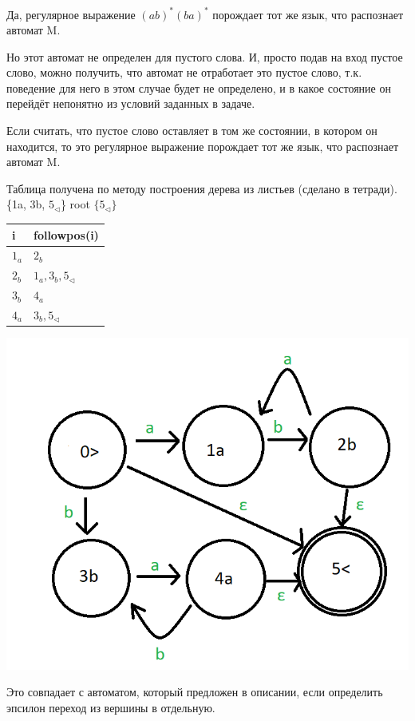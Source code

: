\documentclass[a4paper,14pt]{article} %
\begin{document}
Да, регулярное выражение $(ab)^{*}(ba)^{*}$ порождает тот же язык, что распознает автомат M.

Но этот автомат не определен для пустого слова. И, просто подав на вход пустое слово, можно получить, что автомат не отработает это пустое слово, т.к. поведение для него в этом случае будет не определено, и в какое состояние он перейдёт непонятно из условий заданных в задаче.

Если считать, что пустое слово оставляет в том же состоянии, в котором он находится, то это регулярное выражение порождает тот же язык, что распознает автомат M.

Таблица получена по методу построения дерева из листьев (сделано в тетради).
\{1a, 3b, $5_{\triangleleft}$\} root $\{5_{\triangleleft}\}$

\vspace{5mm}
\begin{tabular}{ | l | l |}
    \hline
    i & followpos(i)     \\ \hline
    $1_a$ & $2_b$       \\
    $2_b$ & $1_a, 3_b, 5_{\triangleleft}$  \\
    $3_b$ & $4_a$       \\
    $4_a$ & $3_b, 5_{\triangleleft}$       \\
    \hline
    \end{tabular}


\includegraphics[scale=0.5]{06.png}

Это совпадает с автоматом, который предложен в описании, если определить эпсилон переход из вершины в отдельную.
\end{document}
